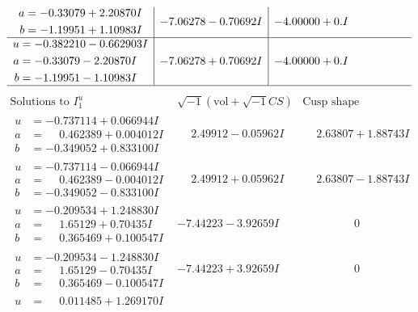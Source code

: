\documentclass[1p]{elsarticle_modified}
\theoremstyle{definition}
\newcommand{\I}{\sqrt{-1}}
\begin{document}
$$\begin{array}{c|c|c}
\begin{aligned}
a &= -0.33079 + 2.20870 I \\
b &= -1.19951 + 1.10983 I\end{aligned}
 & -7.06278 - 0.70692 I & -4.00000 + 0. I\phantom{ +0.000000I} \\ \hline\begin{aligned}
u &= -0.382210 - 0.662903 I \\
a &= -0.33079 - 2.20870 I \\
b &= -1.19951 - 1.10983 I\end{aligned}
 & -7.06278 + 0.70692 I & -4.00000 + 0. I\phantom{ +0.000000I}\\
 \hline 
 \end{array}$$\newpage$$\begin{array}{c|c|c}  
\text{Solutions to }I^u_{1}& \I (\text{vol} + \sqrt{-1}CS) & \text{Cusp shape}\\
 \hline 
\begin{aligned}
u &= -0.737114 + 0.066944 I \\
a &= \phantom{-}0.462389 + 0.004012 I \\
b &= -0.349052 + 0.833100 I\end{aligned}
 & \phantom{-}2.49912 - 0.05962 I & \phantom{-}2.63807 + 1.88743 I \\ \hline\begin{aligned}
u &= -0.737114 - 0.066944 I \\
a &= \phantom{-}0.462389 - 0.004012 I \\
b &= -0.349052 - 0.833100 I\end{aligned}
 & \phantom{-}2.49912 + 0.05962 I & \phantom{-}2.63807 - 1.88743 I \\ \hline\begin{aligned}
u &= -0.209534 + 1.248830 I \\
a &= \phantom{-}1.65129 + 0.70435 I \\
b &= \phantom{-}0.365469 + 0.100547 I\end{aligned}
 & -7.44223 - 3.92659 I & \phantom{-0.000000 } 0 \\ \hline\begin{aligned}
u &= -0.209534 - 1.248830 I \\
a &= \phantom{-}1.65129 - 0.70435 I \\
b &= \phantom{-}0.365469 - 0.100547 I\end{aligned}
 & -7.44223 + 3.92659 I & \phantom{-0.000000 } 0 \\ \hline\begin{aligned}
u &= \phantom{-}0.011485 + 1.269170 I \\

\end{aligned}
\end{array}$$
\end{document}
